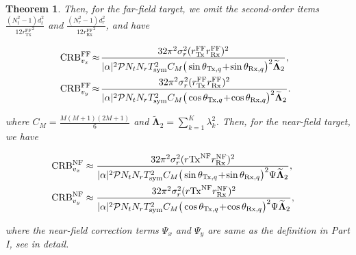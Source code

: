 \documentclass[9pt,final,journal,twocolumn]{IEEEtran}
\newtheorem{theorem}{Theorem}
\begin{document}
\begin{theorem}
Then, for the far-field target, we omit the second-order items $\frac{(N_t^2-1)d_t^2}{12{r_{\mathrm{Tx}}^{\mathrm{FF}}}^2}$ and $\frac{(N_r^2-1)d_r^2}{12{r_{\mathrm{Rx}}^{\mathrm{FF}}}^2}$, and have
\begin{small}
\begin{subequations}
\label{CRB_vel_FF_final}
\begin{align}
\hspace*{-0.5em}\mathrm{CRB}_{v_x}^{\mathrm{FF}}
&\!\approx\!
\frac{32\pi^2\sigma_r^2(r_{\mathrm{Tx}}^{\mathrm{FF}}r_{\mathrm{Rx}}^{\mathrm{FF}})^2}
{|\alpha|^2\mathcal{P}N_tN_rT_{\mathrm{sym}}^2
C_M
\big(\sin\theta_{\mathrm{Tx},q}\!+\!\sin\theta_{\mathrm{Rx},q}\big)^2\widetilde{\bm\Lambda}_2}, \\
\hspace*{-0.5em}\mathrm{CRB}_{v_y}^{\mathrm{FF}}
&\!\approx\!
\frac{32\pi^2\sigma_r^2(r_{\mathrm{Tx}}^{\mathrm{FF}}r_{\mathrm{Rx}}^{\mathrm{FF}})^2}
{|\alpha|^2\mathcal{P}N_tN_rT_{\mathrm{sym}}^2
C_M
\big(\cos\theta_{\mathrm{Tx},q}\!+\!\cos\theta_{\mathrm{Rx},q}\big)^2\widetilde{\bm\Lambda}_2}.
\end{align}
\end{subequations}
\end{small}
\noindent\hspace{-0.5em}where $C_M=\frac{M(M+1)(2M+1)}{6}$ and $\widetilde{\bm\Lambda}_2=\sum_{k=1}^{K}\lambda_k^2$.
Then, for the near-field target, we have
\begin{small}
\begin{subequations}
\label{CRB_vel_NF_final}
\begin{align}
&\hspace*{-1em}\mathrm{CRB}_{v_x}^{\mathrm{NF}}
\approx
\frac{32\pi^2\sigma_r^2({r{\mathrm{Tx}}^{\mathrm{NF}}}{r_{\mathrm{Rx}}^{\mathrm{NF}}})^2}
{|\alpha|^2\mathcal{P}N_tN_rT_{\mathrm{sym}}^2
C_M\big(\sin\theta_{\mathrm{Tx},q}\!+\!\sin\theta_{\mathrm{Rx},q}\big)^2
\Psi\widetilde{\bm\Lambda}_2},\\
&\hspace*{-1em}\mathrm{CRB}_{v_y}^{\mathrm{NF}} 
\approx
\frac{32\pi^2\sigma_r^2({r{\mathrm{Tx}}^{\mathrm{NF}}}{r_{\mathrm{Rx}}^{\mathrm{NF}}})^2}
{|\alpha|^2\mathcal{P}N_tN_rT_{\mathrm{sym}}^2
C_M\big(\cos\theta_{\mathrm{Tx},q}\!+\!\cos\theta_{\mathrm{Rx},q}\big)^2
\Psi\widetilde{\bm\Lambda}_2},
\end{align}
\end{subequations}
\end{small}
where the near-field correction terms $\Psi_{x}$ and $\Psi_{y}$ are same as the definition in Part I, see \cite{wei2025PartI} in detail.
\end{theorem}
\end{document}
